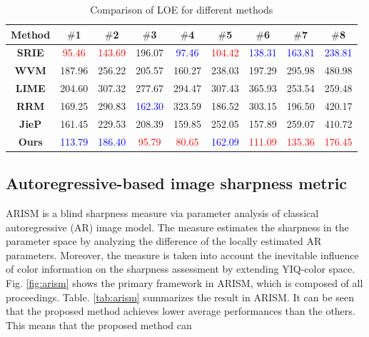 \begin{table}[tb]
	\begin{center} 
	\caption{Comparison of LOE for different methods}
	\begin{tabular}{c||c|c|c|c|c|c|c|c} \hline
	\bf{Method} & {$\#$1} & {$\#$2} & {$\#$3} & {$\#$4} & {$\#$5} & {$\#$6} & {$\#$7} & {$\#$8} \\ \hline \hline
	\textbf{SRIE} & \textcolor{red}{95.46} & \textcolor{red}{143.69} & 196.07 & \textcolor{blue}{97.46} & \textcolor{red}{104.42} & \textcolor{blue}{138.31} & \textcolor{blue}{163.81} & \textcolor{blue}{238.81} \\ \hline
	\textbf{WVM} & 187.96 & 256.22 & 205.57 & 160.27 & 238.03 & 197.29 & 295.98 & 480.98 \\ \hline
	\textbf{LIME} & 204.60 & 307.32 & 277.67 & 294.47 &  307.43 & 365.93 & 253.54 & 259.48 \\ \hline
	\textbf{RRM} & 169.25 & 290.83 & \textcolor{blue}{162.30} & 323.59 & 186.52 & 303.15 & 196.50 & 420.17 \\ \hline
	\textbf{JieP} & 161.45 & 229.53 & 208.39 & 159.85 & 252.05 & 157.89 & 259.07 & 410.72 \\  \hline \hline
	\textbf{Ours} & \textcolor{blue}{113.79} & \textcolor{blue}{186.40} & \textcolor{red}{95.79} & \textcolor{red}{80.65} & \textcolor{blue}{162.09} & \textcolor{red}{111.09} & \textcolor{red}{135.36} & \textcolor{red}{176.45} \\ \hline
	\end{tabular} \label{tab:loe}
	\end{center}
\end{table}

\subsection{Autoregressive-based image sharpness metric}
ARISM is a blind sharpness measure via parameter analysis of classical autoregressive (AR) image model. The measure estimates the sharpness in the parameter space by analyzing the difference of the locally estimated AR parameters. Moreover, the measure is taken into account the inevitable influence of color information on the sharpness assessment by extending YIQ-color space. Fig. \ref{fig:arism} shows the primary framework in ARISM, which is composed of all proceedings. Table. \ref{tab:arism} summarizes the result in ARISM. It can be seen that the proposed method achieves lower average performances than the others. This means that the proposed method can 
